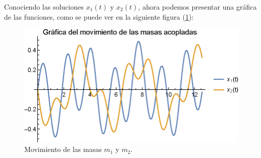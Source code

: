 Conociendo las soluciones $x_{1}(t)$ y $x_{2}(t)$, ahora podemos presentar una gráfica de las funciones, como se puede ver en la siguiente figura (\ref{fig:plot_dos_masas_01}):
\begin{figure}[H]
    \centering
    \includegraphics[scale=1.2]{Imagenes/Ejercicio_masas_acopladas_01.eps}
    \caption{Movimiento de las masas $m_{1}$ y $m_{2}$.}
    \label{fig:plot_dos_masas_01}
\end{figure}



